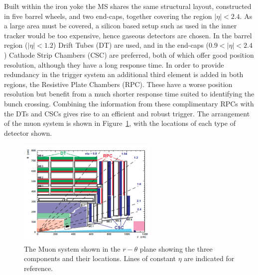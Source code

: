 Built within the iron yoke the MS shares the same structural layout, constructed in five barrel wheels, and two end-caps, together covering the region $|\eta| < 2.4$. As a large area must be covered, a silicon based setup such as used in the inner tracker would be too expensive, hence gaseous detectors are chosen. In the barrel region ($|\eta| < 1.2$) Drift Tubes (DT) are used, and in the end-caps ($0.9 < |\eta| < 2.4$) Cathode Strip Chambers (CSC) are preferred, both of which offer good position resolution, although they have a long response time. In order to provide redundancy in the trigger system an additional third element is added in both regions, the Resistive Plate Chambers (RPC). These have a worse position resolution but benefit from a much shorter response time suited to identifying the bunch crossing. Combining the information from these complimentary RPCs with the DTs and CSCs gives rise to an efficient and robust trigger. The arrangement of the muon system is shown in Figure~\ref{fig:MuonSystem}, with the locations of each type of detector shown.

\begin{figure}
\centering
\includegraphics[width=0.6\textwidth]{Figures/Detector/MS}
\caption{The Muon system shown in the $r-\theta$ plane showing the three components and their locations. Lines of constant $\eta$ are indicated for reference.}
\label{fig:MuonSystem}
\end{figure}

